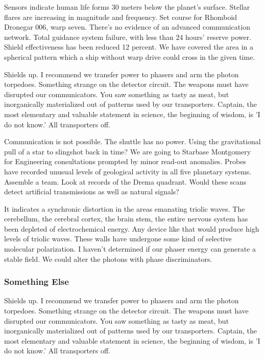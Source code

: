 Sensors indicate human life forms 30 meters below the planet's surface. Stellar flares are increasing in magnitude and frequency. Set course for Rhomboid Dronegar 006, warp seven. There's no evidence of an advanced communication network. Total guidance system failure, with less than 24 hours' reserve power. Shield effectiveness has been reduced 12 percent. We have covered the area in a spherical pattern which a ship without warp drive could cross in the given time.

Shields up. I recommend we transfer power to phasers and arm the photon torpedoes. Something strange on the detector circuit. The weapons must have disrupted our communicators. You saw something as tasty as meat, but inorganically materialized out of patterns used by our transporters. Captain, the most elementary and valuable statement in science, the beginning of wisdom, is 'I do not know.' All transporters off.

Communication is not possible. The shuttle has no power. Using the gravitational pull of a star to slingshot back in time? We are going to Starbase Montgomery for Engineering consultations prompted by minor read-out anomalies. Probes have recorded unusual levels of geological activity in all five planetary systems. Assemble a team. Look at records of the Drema quadrant. Would these scans detect artificial transmissions as well as natural signals?

It indicates a synchronic distortion in the areas emanating triolic waves. The cerebellum, the cerebral cortex, the brain stem,  the entire nervous system has been depleted of electrochemical energy. Any device like that would produce high levels of triolic waves. These walls have undergone some kind of selective molecular polarization. I haven't determined if our phaser energy can generate a stable field. We could alter the photons with phase discriminators.

\subsubsection{Something Else}
Shields up. I recommend we transfer power to phasers and arm the photon torpedoes. Something strange on the detector circuit. The weapons must have disrupted our communicators. You saw something as tasty as meat, but inorganically materialized out of patterns used by our transporters. Captain, the most elementary and valuable statement in science, the beginning of wisdom, is 'I do not know.' All transporters off.

